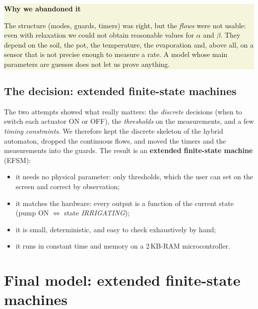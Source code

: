 \documentclass[10pt,a4paper,twocolumn]{article}
\newcommand{\keyword}[1]{\textbf{\color{brown}#1}}
\newcommand{\infobox}[2]{%
  \par\noindent\colorbox{beige}{\parbox{\dimexpr\columnwidth-2\fboxsep}{%
  \sffamily\small\textbf{\color{accent}#1}\par\smallskip\rmfamily #2}}\par}
\begin{document}
\infobox{Why we abandoned it}{%
The structure (modes, guards, timers) was right, but the \emph{flows} were not usable:
even with relaxation we could not obtain reasonable values for $\alpha$ and $\beta$.
They depend on the soil, the pot, the temperature, the evaporation and, above all, on a
sensor that is not precise enough to measure a rate. A model whose main parameters are
guesses does not let us prove anything.}

\subsection{The decision: extended finite-state machines}
The two attempts showed what really matters: the \emph{discrete} decisions (when to
switch each actuator ON or OFF), the \emph{thresholds} on the measurements, and a few
\emph{timing constraints}. We therefore kept the discrete skeleton of the hybrid
automaton, dropped the continuous flows, and moved the timers and the measurements
into the guards. The result is an \keyword{extended finite-state machine} (EFSM):
\begin{itemize}
  \item it needs no physical parameter: only thresholds, which the user can set
        on the screen and correct by observation;
  \item it matches the hardware: every output is a function of the current state
        (pump ON $\iff$ state \emph{IRRIGATING});
  \item it is small, deterministic, and easy to check exhaustively by hand;
  \item it runs in constant time and memory on a 2\,KB-RAM microcontroller.
\end{itemize}

\section{Final model: extended finite-state machines}\label{sec:final}
\end{document}
